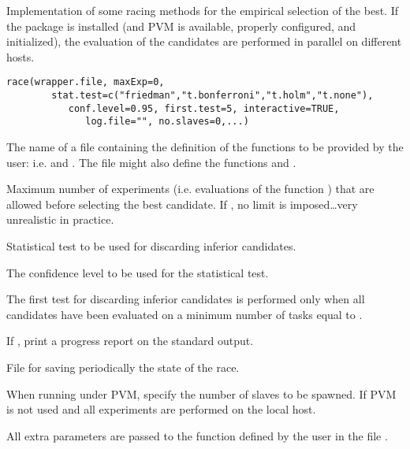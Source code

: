\begin{Description}\relax
Implementation of some racing methods for the empirical
selection of the best. If the \R{} package  is installed
(and PVM is available, properly configured, and initialized), the
evaluation of the candidates are performed in parallel on different
hosts.
\end{Description}
\begin{Usage}
\begin{verbatim}
race(wrapper.file, maxExp=0,
        stat.test=c("friedman","t.bonferroni","t.holm","t.none"),
           conf.level=0.95, first.test=5, interactive=TRUE,
              log.file="", no.slaves=0,...)
\end{verbatim}
\end{Usage}
\begin{Arguments}
\begin{ldescription}
\item[\code{wrapper.file}] The name of a file containing the definition of 
the functions to be provided by the user: i.e.
 and . The file
 might also define the functions
 and .
\item[\code{maxExp}] Maximum number of experiments (i.e. evaluations of the
function ) that are allowed before selecting the
best candidate. If , no limit is imposed\ldots very
unrealistic in practice.
\item[\code{stat.test}] Statistical test to be used for discarding inferior
candidates.
\item[\code{conf.level}] The confidence level to be used for the statistical
test.
\item[\code{first.test}] The first test for discarding inferior candidates is
performed only when all candidates have been evaluated on a minimum
number of tasks equal to .
\item[\code{interactive}] If , print a progress report on the
standard output.
\item[\code{log.file}] File for saving periodically the state of the race.
\item[\code{no.slaves}] When running under PVM,  specify the
number of slaves to be spawned. If  PVM is not used
and all experiments are performed on the local host.
\item[\code{...}] All extra parameters are passed to the function
 defined by the user in the file
.
\end{ldescription}
\end{Arguments}
